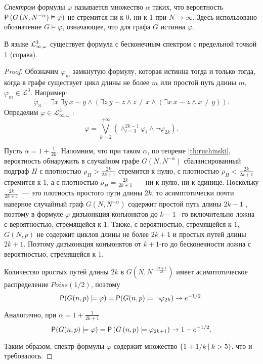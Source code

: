 
\Def \textit{Спектром} формулы $\varphi$ называется множество $\alpha$ таких, что вероятность $\P\left( G\left(N, N^{-\alpha}\right) \vDash \varphi  \right)$ не стремится ни к 0, ни к 1 при $N \rightarrow \infty$.
Здесь использовано обозначение $G \vDash \varphi$, означающее, что для графа $G$ истинна $\varphi$.

\begin{theorem}
В языке $\LL^3_{\infty, \omega}$ существует формула с бесконечным спектром с предельной точкой 1 (справа).
\end{theorem}
\begin{proof}
Обозначим $\varphi_m$ замкнутую формулу, которая истинна тогда и только тогда, когда в графе существует цикл длины не более $m$  или простой путь длины $m$,  $\varphi_m \in \mathcal{L}^3$. Например:
\[
\varphi_3 = \exists x ~\exists y ~
 x \sim y  \wedge \left( \exists z ~ y \sim z \wedge  z \neq x 
\wedge \left(\exists x ~ x \sim z \wedge x \neq y
\right) \right) .
\]
Определим $\varphi \in \mathcal{L}^3_{\infty, \omega}$ :
\[
\varphi = \bigvee_{k = 2}^{+\infty}\left(
\wedge_{i=3}^{2k-1} \varphi_{i}  \wedge \neg \varphi_{2k} \right).
\]

Пусть $\alpha = 1 + \frac{1}{2k}$.
Напомним, что при таком $\alpha$, по теореме \ref{th:ruchinski}, вероятность обнаружить в случайном графе $G(N, N^{-\alpha})$ сбалансированный подграф $H$ с плотностью $\rho_H > \frac{2k}{2k+1}$ стремится к нулю, с плотностью $\rho_H < \frac{2k}{2k+1}$ стремится к 1, а с плотностью $\rho_H = \frac{2k}{2k+1}$~--- ни к нулю, ни к единице.
Поскольку $\frac{2k}{2k+1}$~--- это плотность простого пути длины $2k$, то асимптотически почти наверное случайный граф $G(N, N^{-\alpha})$ содержит простой путь длины $2k-1$ , поэтому в формуле $\varphi$ дизъюнкция конъюнктов до $k-1$~-го включительно ложна с вероятностью, стремящейся к 1.
Также, с вероятностью, стремящейся к 1, $G(N, p)$ не содержит циклов длины не более $2k+1$ и простых путей длины $2k+1$.
Поэтому дизъюнкция конъюнктов от $k+1$-го до бесконечности ложна с вероятностью, стремящейся к 1.

Количество простых путей длины $2k$ в $G(N, N^{-\frac{2k+1}{2k}})$ имеет асимптотическое распределение $Poiss(1/2)$, поэтому
$$
\P(G(n, p) \models \varphi) = 
\P(G(n, p) \models \neg \varphi_{2k}) \rightarrow e^{-1/2}.
$$

Аналогично, при $\alpha = 1 + \frac{1}{2k+1}$ 
$$\P(G(n, p) \models \varphi) = 
\P\left(G\left(n, p \right) \models  \varphi_{2k+1}\right) \rightarrow 1 - e^{-1/2}.$$

Таким образом, спектр формулы $\varphi$ содержит множество $\{1 + 1/k ~|~ k > 5 \}$, что и требовалось.
\end{proof}